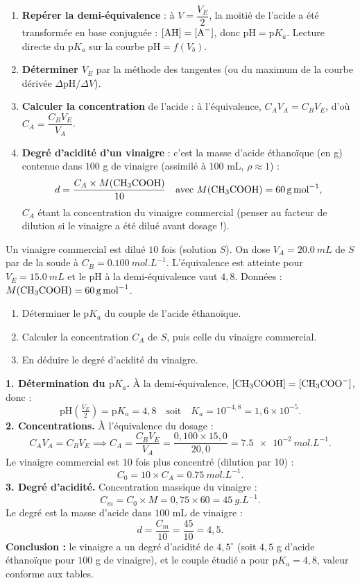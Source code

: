 \documentclass[11pt]{article}
\begin{document}
\begin{methode}
\begin{enumerate}
\item \textbf{Repérer la demi-équivalence} : à $V = \dfrac{V_E}{2}$, la moitié de l'acide a été transformée en base conjuguée : $[\ce{AH}] = [\ce{A-}]$, donc $\mathrm{pH} = \mathrm{p}K_a$. Lecture directe du $\mathrm{p}K_a$ sur la courbe $\mathrm{pH} = f(V_b)$.
\item \textbf{Déterminer $V_E$} par la méthode des tangentes (ou du maximum de la courbe dérivée $\Delta\mathrm{pH}/\Delta V$).
\item \textbf{Calculer la concentration} de l'acide : à l'équivalence, $C_A V_A = C_B V_E$, d'où $C_A = \dfrac{C_B V_E}{V_A}$.
\item \textbf{Degré d'acidité d'un vinaigre} : c'est la masse d'acide éthanoïque (en g) contenue dans $100$ g de vinaigre (assimilé à $100$ mL, $\rho \approx 1$) :
\[ d = \frac{C_A \times M(\ce{CH3COOH})}{10} \quad \text{avec } M(\ce{CH3COOH}) = \SI{60}{g.mol^{-1}}, \]
$C_A$ étant la concentration du vinaigre commercial (penser au facteur de dilution si le vinaigre a été dilué avant dosage !).
\end{enumerate}
\end{methode}

\begin{exoresolu}
Un vinaigre commercial est dilué $10$ fois (solution $S$). On dose $V_A = \SI{20,0}{mL}$ de $S$ par de la soude à $C_B = \SI{0,100}{mol.L^{-1}}$. L'équivalence est atteinte pour $V_E = \SI{15,0}{mL}$ et le pH à la demi-équivalence vaut $4,8$. Données : $M(\ce{CH3COOH}) = \SI{60}{g.mol^{-1}}$.
\begin{enumerate}
\item Déterminer le $\mathrm{p}K_a$ du couple de l'acide éthanoïque.
\item Calculer la concentration $C_A$ de $S$, puis celle du vinaigre commercial.
\item En déduire le degré d'acidité du vinaigre.
\end{enumerate}
\tcblower
\textbf{1. Détermination du $\mathrm{p}K_a$.} À la demi-équivalence, $[\ce{CH3COOH}] = [\ce{CH3COO-}]$, donc :
\[ \mathrm{pH}\left(\tfrac{V_E}{2}\right) = \mathrm{p}K_a = 4,8 \quad \text{soit} \quad K_a = 10^{-4,8} = 1,6\times 10^{-5}. \]
\textbf{2. Concentrations.} À l'équivalence du dosage  :
\[ C_A V_A = C_B V_E \implies C_A = \frac{C_B V_E}{V_A} = \frac{0,100 \times 15,0}{20,0} = \SI{7,5e-2}{mol.L^{-1}}. \]
Le vinaigre commercial est $10$ fois plus concentré (dilution par 10) :
\[ C_0 = 10 \times C_A = \SI{0,75}{mol.L^{-1}}. \]
\textbf{3. Degré d'acidité.} Concentration massique du vinaigre :
\[ C_m = C_0 \times M = 0,75 \times 60 = \SI{45}{g.L^{-1}}. \]
Le degré est la masse d'acide dans $100$ mL de vinaigre :
\[ d = \frac{C_m}{10} = \frac{45}{10} = 4,5. \]
\textbf{Conclusion :} le vinaigre a un degré d'acidité de $4,5^{\circ}$ (soit $4,5$ g d'acide éthanoïque pour $100$ g de vinaigre), et le couple étudié a pour $\mathrm{p}K_a = 4,8$, valeur conforme aux tables.
\end{exoresolu}
\end{document}
